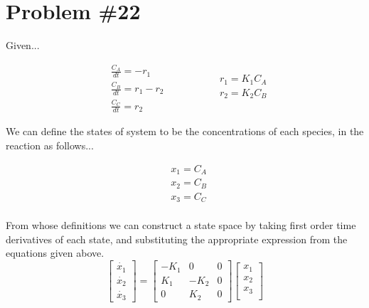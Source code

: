 \section*{Problem \#22}


Given...

\begin{equation*}
    \begin{aligned}
        & \frac{C_{A}}{dt} = -r_{1} \\
        & \frac{C_{B}}{dt} = r_{1} - r_{2} \\
        & \frac{C_{C}}{dt} = r_{2}
    \end{aligned}
    \qquad \qquad
    \begin{aligned}
        & r_{1} = K_{1}C_{A} \\
        & r_{2} = K_{2}C_{B} \\
    \end{aligned}
\end{equation*}

We can define the states of system to be the concentrations of each species, in the reaction as follows...

\begin{equation*}
    \begin{aligned}
        & x_{1} = C_{A} \\
        & x_{2} = C_{B} \\
        & x_{3} = C_{C} \\
    \end{aligned}
\end{equation*}

From whose definitions we can construct a state space by taking first order time derivatives of each state, and substituting the appropriate expression from the equations given above. \\
$$
\begin{bmatrix}
    \dot{x_{1}} \\
    \dot{x_{2}} \\
    \dot{x_{3}}
\end{bmatrix}
=
\begin{bmatrix}
    -K_{1} & 0 & 0 \\
    K_{1} & -K_{2} & 0 \\
    0 & K_{2} & 0
\end{bmatrix}
\begin{bmatrix}
    x_{1} \\
    x_{2} \\
    x_{3} \\
\end{bmatrix}
$$

